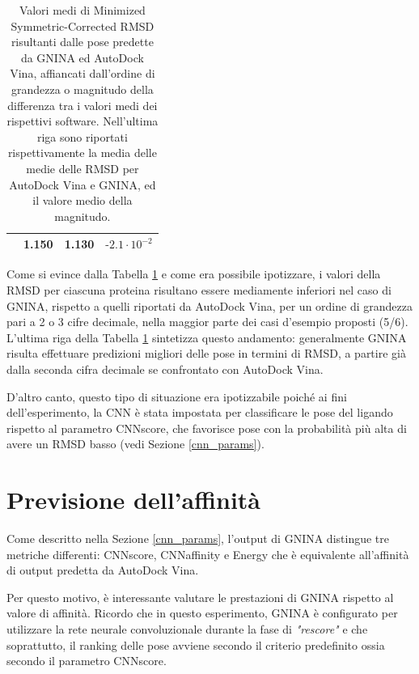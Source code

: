 \begin{table}[H]
{\begin{tabular}{cccc}
\multicolumn{1}{l}{} & 1.150                                                                         & 1.130                                                                 & \(\textbf{-}2.1 \cdot 10^{-2}\) \\ \bottomrule
\end{tabular}%
}
\caption[Valori medi di RMSD* e magnitudo della differenza risultanti dalle pose predette da GNINA ed AutoDock Vina.]
{\small Valori medi di Minimized Symmetric-Corrected RMSD risultanti dalle pose predette da GNINA ed AutoDock Vina, affiancati dall'ordine di grandezza o magnitudo della differenza tra i valori medi dei rispettivi software. Nell'ultima riga sono riportati rispettivamente la media delle medie delle RMSD per AutoDock Vina e GNINA, ed il valore medio della magnitudo.}
\label{rmsd_table}
\end{table}

Come si evince dalla Tabella \ref{rmsd_table} e come era possibile ipotizzare, i valori della RMSD per ciascuna proteina risultano essere mediamente inferiori nel caso di GNINA, rispetto a quelli riportati da AutoDock Vina, per un ordine di grandezza pari a 2 o 3 cifre decimale, nella maggior parte dei casi d'esempio proposti (5/6).
L'ultima riga della Tabella \ref{rmsd_table} sintetizza questo andamento: generalmente GNINA risulta effettuare predizioni migliori delle pose in termini di RMSD, a partire già dalla seconda cifra decimale se confrontato con AutoDock Vina.

D'altro canto, questo tipo di situazione era ipotizzabile poiché ai fini dell'esperimento, la CNN è stata impostata per classificare le pose del ligando rispetto al parametro CNNscore, che favorisce pose con la probabilità più alta di avere un RMSD basso (vedi Sezione \ref{cnn_params}).

\section{Previsione dell'affinità}
Come descritto nella Sezione \ref{cnn_params}, l'output di GNINA distingue tre metriche differenti: CNNscore, CNNaffinity e Energy che è equivalente all'affinità di output predetta da AutoDock Vina.

Per questo motivo, è interessante valutare le prestazioni di GNINA rispetto al valore di affinità.
Ricordo che in questo esperimento, GNINA è configurato per utilizzare la rete neurale convoluzionale durante la fase di \textit{"rescore"} e che soprattutto, il ranking delle pose avviene secondo il criterio predefinito ossia secondo il parametro CNNscore.

